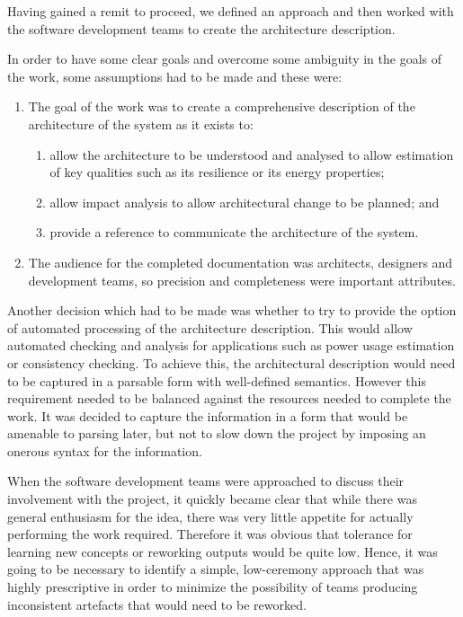   Having gained a remit to proceed, we defined an approach and then worked with the software development teams to create the architecture description.

  In order to have some clear goals and overcome some ambiguity in the goals of the work, some assumptions had to be made and these were:

 \begin{enumerate}

\item The goal of the work was to create a comprehensive description of the architecture of the system as it exists to:
\begin{enumerate}
\item allow the architecture to be understood and analysed to allow estimation of key qualities such as its resilience or its energy properties;
\item allow impact analysis to allow architectural change to be planned; and 
\item provide a reference to communicate the architecture of the system.
\end{enumerate}

\item The audience for the completed documentation was architects, designers and development teams, so precision and completeness were important attributes.

\end{enumerate}

Another decision which had to be made was whether to try to provide the option of automated processing of the architecture description.  This would allow automated checking and analysis for applications such as power usage estimation or consistency checking.  To achieve this, the architectural description would need to be captured in a parsable form with well-defined semantics.  However this requirement needed to be balanced against the resources needed to complete the work.  It was decided to capture the information in a form that would be amenable to parsing later, but not to slow down the project by imposing an onerous syntax for the information.

When the software development teams were approached to discuss their involvement with the project, it quickly became clear that while there was general enthusiasm for the idea, there was very little appetite for actually performing the work required.  Therefore it was obvious that tolerance for learning new concepts or reworking outputs would be quite low.  Hence, it was going to be necessary to identify a simple, low-ceremony approach that was highly prescriptive in order to minimize the possibility of teams producing inconsistent artefacts that would need to be reworked.

